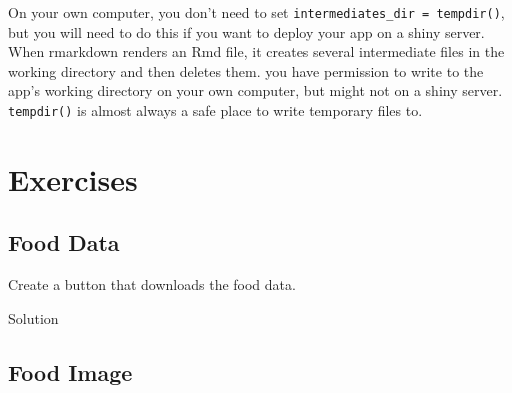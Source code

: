 \documentclass[
]{book}
\newenvironment{Shaded}{\begin{snugshade}}{\end{snugshade}}
\newcommand{\AttributeTok}[1]{\textcolor[rgb]{0.77,0.63,0.00}{#1}}
\newcommand{\CommentTok}[1]{\textcolor[rgb]{0.56,0.35,0.01}{\textit{#1}}}
\newcommand{\ControlFlowTok}[1]{\textcolor[rgb]{0.13,0.29,0.53}{\textbf{#1}}}
\newcommand{\DocumentationTok}[1]{\textcolor[rgb]{0.56,0.35,0.01}{\textbf{\textit{#1}}}}
\newcommand{\FunctionTok}[1]{\textcolor[rgb]{0.00,0.00,0.00}{#1}}
\newcommand{\NormalTok}[1]{#1}
\newcommand{\OtherTok}[1]{\textcolor[rgb]{0.56,0.35,0.01}{#1}}
\newcommand{\SpecialCharTok}[1]{\textcolor[rgb]{0.00,0.00,0.00}{#1}}
\newcommand{\StringTok}[1]{\textcolor[rgb]{0.31,0.60,0.02}{#1}}
\begin{document}
On your own computer, you don't need to set \texttt{intermediates\_dir\ =\ tempdir()}, but you will need to do this if you want to deploy your app on a shiny server. When rmarkdown renders an Rmd file, it creates several intermediate files in the working directory and then deletes them. you have permission to write to the app's working directory on your own computer, but might not on a shiny server. \texttt{tempdir()} is almost always a safe place to write temporary files to.

\hypertarget{exercises-reports}{%
\section{Exercises}\label{exercises-reports}}

\hypertarget{food-data}{%
\subsection{Food Data}\label{food-data}}

Create a button that downloads the food data.

Solution

\begin{Shaded}
\end{Shaded}

\hypertarget{food-image}{%
\subsection{Food Image}\label{food-image}}
\end{document}

